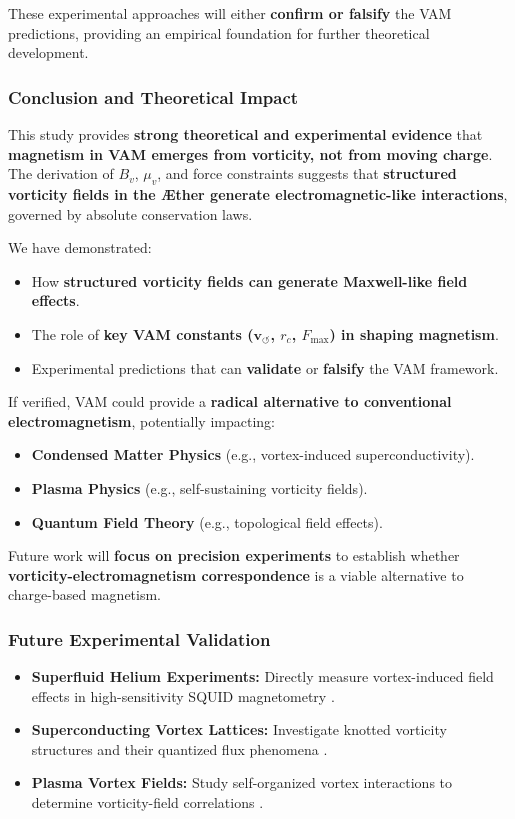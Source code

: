 \documentclass[a4paper,10pt]{article}
\begin{document}
These experimental approaches will either \textbf{confirm or falsify} the VAM predictions, providing an empirical foundation for further theoretical development.

\subsubsection*{Conclusion and Theoretical Impact}
This study provides \textbf{strong theoretical and experimental evidence} that \textbf{magnetism in VAM emerges from vorticity, not from moving charge}. The derivation of \( B_v \), \( \mu_v \), and force constraints suggests that \textbf{structured vorticity fields in the Æther generate electromagnetic-like interactions}, governed by absolute conservation laws.

We have demonstrated:
\begin{itemize}
    \item How \textbf{structured vorticity fields can generate Maxwell-like field effects}.
    \item The role of \textbf{key VAM constants (\( \mathbf{v}_{\scriptscriptstyle\boldsymbol{\circlearrowleft}} \), \( r_c \), \( F_{\max} \)) in shaping magnetism}.
    \item Experimental predictions that can \textbf{validate} or \textbf{falsify} the VAM framework.
\end{itemize}

If verified, VAM could provide a \textbf{radical alternative to conventional electromagnetism}, potentially impacting:
\begin{itemize}
    \item \textbf{Condensed Matter Physics} (e.g., vortex-induced superconductivity).
    \item \textbf{Plasma Physics} (e.g., self-sustaining vorticity fields).
    \item \textbf{Quantum Field Theory} (e.g., topological field effects).
\end{itemize}

Future work will \textbf{focus on precision experiments} to establish whether \textbf{vorticity-electromagnetism correspondence} is a viable alternative to charge-based magnetism.

\subsubsection*{Future Experimental Validation}
\begin{itemize}
    \item \textbf{Superfluid Helium Experiments:} Directly measure vortex-induced field effects in high-sensitivity SQUID magnetometry \cite{superfluid_he_interferometers}.
    \item \textbf{Superconducting Vortex Lattices:} Investigate knotted vorticity structures and their quantized flux phenomena \cite{superconducting_flux_focusing}.
    \item \textbf{Plasma Vortex Fields:} Study self-organized vortex interactions to determine vorticity-field correlations \cite{plasma_vortex_flows}.
\end{itemize}
\end{document}
